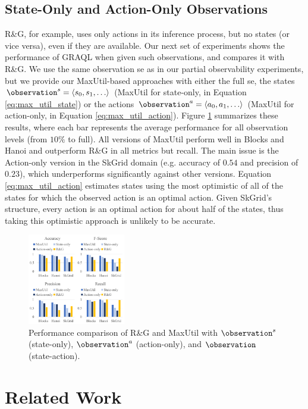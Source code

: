 \documentclass[letterpaper]{article} %
\begin{document}
\subsection{State-Only and Action-Only Observations}

R\&G, for example, uses only actions in its inference process, but no states (or vice versa), even if they are available.
Our next set of experiments shows the performance of GRAQL when given such observations, and compares it with R\&G.
We use the same observation se as in our partial observability experiments, but we provide our MaxUtil-based approaches with either the full se, the states $\observation^s = \langle s_0, s_1, \ldots \rangle$ (MaxUtil for state-only, in Equation \ref{eq:max_util_state}) or the actions $\observation^a = \langle a_0, a_1, \ldots \rangle$ (MaxUtil for action-only, in Equation \ref{eq:max_util_action}).
Figure \ref{fig:simpler_obs} summarizes these results, where each bar represents the average performance for all observation levels (from $10\%$ to full).
All versions of MaxUtil perform well in Blocks and Hanoi and outperform R\&G in all metrics but recall.
The main issue is the Action-only version in the SkGrid domain (e.g. accuracy of $0.54$ and precision of $0.23$), which underperforms significantly against other versions.
Equation \ref{eq:max_util_action} estimates states using the most optimistic of all of the states for which the observed action is an optimal action.
Given SkGrid's structure, every action is an optimal action for about half of the states, thus taking this optimistic approach is unlikely to be accurate.

\begin{figure}[!b]
    \centering
    \includegraphics[width=0.38\textwidth]{Figures/simpler_observations.pdf}
    \caption{Performance comparison of R\&G and MaxUtil with $\observation^s$ (state-only), $\observation^a$ (action-only), and $\observation$ (state-action).}
    \label{fig:simpler_obs}
\end{figure}

\section{Related Work}
\label{sec:related_work}
\end{document}
